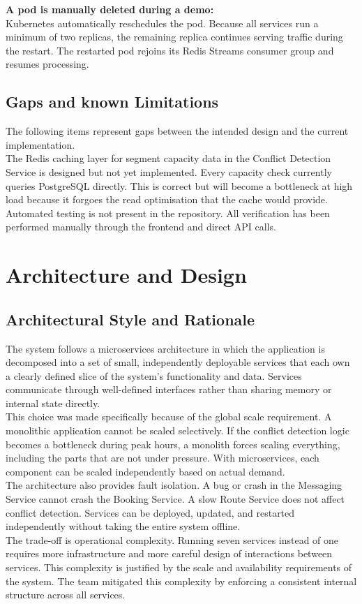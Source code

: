 \documentclass{article}
\begin{document}
\textbf{A pod is manually deleted during a demo:}\\ Kubernetes automatically reschedules the pod. Because all services run a minimum of two replicas, the remaining replica continues serving traffic during the restart. The restarted pod rejoins its Redis Streams consumer group and resumes processing.

\subsection{Gaps and known Limitations}
The following items represent gaps between the intended design and the current implementation.\\
The Redis caching layer for segment capacity data in the Conflict Detection Service is designed but not yet implemented. Every capacity check currently queries PostgreSQL directly. This is correct but will become a bottleneck at high load because it forgoes the read optimisation that the cache would provide.\\
Automated testing is not present in the repository. All verification has been performed manually through the frontend and direct API calls.

\section{Architecture and Design}
\subsection{Architectural Style and Rationale}
The system follows a microservices architecture in which the application is decomposed into a set of small, independently deployable services that each own a clearly defined slice of the system's functionality and data. Services communicate through well-defined interfaces rather than sharing memory or internal state directly.\\
This choice was made specifically because of the global scale requirement. A monolithic application cannot be scaled selectively. If the conflict detection logic becomes a bottleneck during peak hours, a monolith forces scaling everything, including the parts that are not under pressure. With microservices, each component can be scaled independently based on actual demand.\\
The architecture also provides fault isolation. A bug or crash in the Messaging Service cannot crash the Booking Service. A slow Route Service does not affect conflict detection. Services can be deployed, updated, and restarted independently without taking the entire system offline.\\
The trade-off is operational complexity. Running seven services instead of one requires more infrastructure and more careful design of interactions between services. This complexity is justified by the scale and availability requirements of the system. The team mitigated this complexity by enforcing a consistent internal structure across all services.
\end{document}
